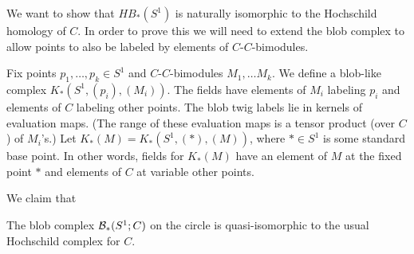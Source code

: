 We want to show that $HB_*(S^1)$ is naturally isomorphic to the
Hochschild homology of $C$.
In order to prove this we will need to extend the blob complex to allow points to also
be labeled by elements of $C$-$C$-bimodules.

Fix points $p_1, \ldots, p_k \in S^1$ and $C$-$C$-bimodules $M_1, \ldots M_k$.
We define a blob-like complex $K_*(S^1, (p_i), (M_i))$.
The fields have elements of $M_i$ labeling $p_i$ and elements of $C$ labeling
other points.
The blob twig labels lie in kernels of evaluation maps.
(The range of these evaluation maps is a tensor product (over $C$) of $M_i$'s.)
Let $K_*(M) = K_*(S^1, (*), (M))$, where $* \in S^1$ is some standard base point.
In other words, fields for $K_*(M)$ have an element of $M$ at the fixed point $*$
and elements of $C$ at variable other points.




We claim that
\begin{thm}
The blob complex ${\mathcal B}_*(S^1; C)$ on the circle is quasi-isomorphic to the
usual Hochschild complex for $C$.
\end{thm}

